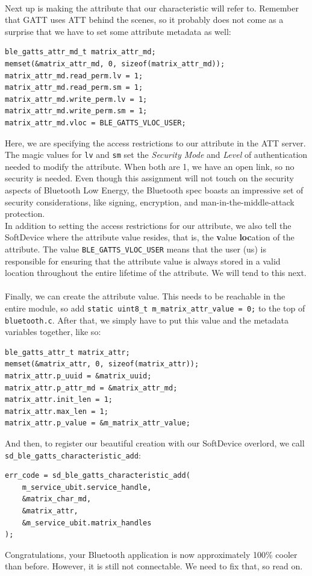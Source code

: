 \documentclass[11pt,a4paper]{article}
\begin{document}
\\
Next up is making the attribute that our characteristic will refer to. Remember that GATT uses ATT behind the scenes, so it probably does not come as a surprise that we have to set some attribute metadata as well:
\begin{verbatim}
ble_gatts_attr_md_t matrix_attr_md;
memset(&matrix_attr_md, 0, sizeof(matrix_attr_md));
matrix_attr_md.read_perm.lv = 1;
matrix_attr_md.read_perm.sm = 1;
matrix_attr_md.write_perm.lv = 1;
matrix_attr_md.write_perm.sm = 1;
matrix_attr_md.vloc = BLE_GATTS_VLOC_USER;
\end{verbatim}
Here, we are specifying the access restrictions to our attribute in the ATT server. The magic values for \texttt{lv} and \texttt{sm} set the \textit{Security Mode} and \textit{Level} of authentication needed to modify the attribute. When both are 1, we have an open link, so no security is needed. Even though this assignment will not touch on the security aspects of Bluetooth Low Energy, the Bluetooth spec boasts an impressive set of security considerations, like signing, encryption, and man-in-the-middle-attack protection.\\
In addition to setting the access restrictions for our attribute, we also tell the SoftDevice where the attribute value resides, that is, the \textbf{v}alue \textbf{loc}ation of the attribute. The value \texttt{BLE_GATTS_VLOC_USER} means that the user (us) is responsible for ensuring that the attribute value is always stored in a valid location throughout the entire lifetime of the attribute. We will tend to this next.\\
\\
Finally, we can create the attribute value. This needs to be reachable in the entire module, so add \texttt{static uint8_t m_matrix_attr_value = 0;} to the top of \texttt{bluetooth.c}. After that, we simply have to put this value and the metadata variables together, like so:
\begin{verbatim}
ble_gatts_attr_t matrix_attr;
memset(&matrix_attr, 0, sizeof(matrix_attr));
matrix_attr.p_uuid = &matrix_uuid;
matrix_attr.p_attr_md = &matrix_attr_md;
matrix_attr.init_len = 1;
matrix_attr.max_len = 1;
matrix_attr.p_value = &m_matrix_attr_value;
\end{verbatim}
And then, to register our beautiful creation with our SoftDevice overlord, we call \texttt{sd_ble_gatts_characteristic_add}:
\begin{verbatim}
err_code = sd_ble_gatts_characteristic_add(
	m_service_ubit.service_handle,
	&matrix_char_md,
	&matrix_attr,
	&m_service_ubit.matrix_handles
);
\end{verbatim}
Congratulations, your Bluetooth application is now approximately 100\% cooler than before. However, it is still not connectable. We need to fix that, so read on.
\end{document}
